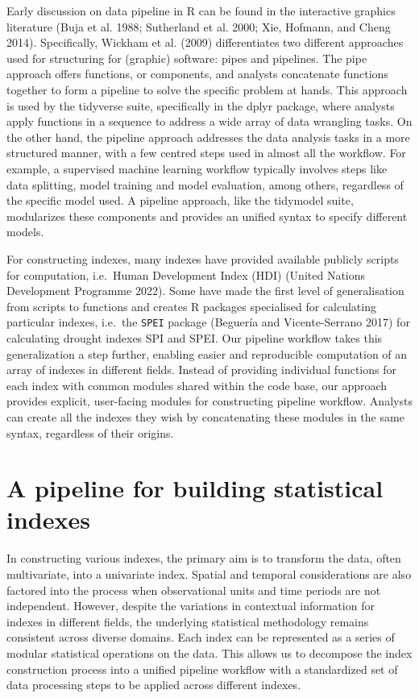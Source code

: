 \documentclass[
]{interact}
\begin{document}
Early discussion on data pipeline in R can be found in the interactive
graphics literature (Buja et al. 1988; Sutherland et al. 2000; Xie,
Hofmann, and Cheng 2014). Specifically, Wickham et al. (2009)
differentiates two different approaches used for structuring for
(graphic) software: pipes and pipelines. The pipe approach offers
functions, or components, and analysts concatenate functions together to
form a pipeline to solve the specific problem at hands. This approach is
used by the tidyverse suite, specifically in the dplyr package, where
analysts apply functions in a sequence to address a wide array of data
wrangling tasks. On the other hand, the pipeline approach addresses the
data analysis tasks in a more structured manner, with a few centred
steps used in almost all the workflow. For example, a supervised machine
learning workflow typically involves steps like data splitting, model
training and model evaluation, among others, regardless of the specific
model used. A pipeline approach, like the tidymodel suite, modularizes
these components and provides an unified syntax to specify different
models.

For constructing indexes, many indexes have provided available publicly
scripts for computation, i.e.~Human Development Index (HDI) (United
Nations Development Programme 2022). Some have made the first level of
generalisation from scripts to functions and creates R packages
specialised for calculating particular indexes, i.e.~the \texttt{SPEI}
package (Beguería and Vicente-Serrano 2017) for calculating drought
indexes SPI and SPEI. Our pipeline workflow takes this generalization a
step further, enabling easier and reproducible computation of an array
of indexes in different fields. Instead of providing individual
functions for each index with common modules shared within the code
base, our approach provides explicit, user-facing modules for
constructing pipeline workflow. Analysts can create all the indexes they
wish by concatenating these modules in the same syntax, regardless of
their origins.

\hypertarget{sec-index-pipeline}{%
\section{A pipeline for building statistical
indexes}\label{sec-index-pipeline}}

In constructing various indexes, the primary aim is to transform the
data, often multivariate, into a univariate index. Spatial and temporal
considerations are also factored into the process when observational
units and time periods are not independent. However, despite the
variations in contextual information for indexes in different fields,
the underlying statistical methodology remains consistent across diverse
domains. Each index can be represented as a series of modular
statistical operations on the data. This allows us to decompose the
index construction process into a unified pipeline workflow with a
standardized set of data processing steps to be applied across different
indexes.
\end{document}
